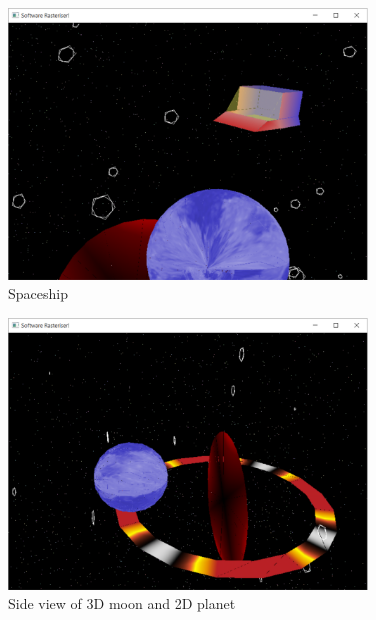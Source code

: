 \documentclass[a4paper]{article}
\title{\DOCTITLE}
\author{\DOCAUTHOR}
\date{\DOCDATE}
\begin{document}

\begin{figure}[h!]
  \centering
  \includegraphics[width=0.85\textwidth]{graphics/screen_2.eps}
  \caption{Spaceship}
  \label{fig:screen_2}
\end{figure}

\begin{figure}[h!]
  \centering
  \includegraphics[width=0.85\textwidth]{graphics/screen_3.eps}
  \caption{Side view of 3D moon and 2D planet}
  \label{fig:screen_3}
\end{figure}
\end{document}
